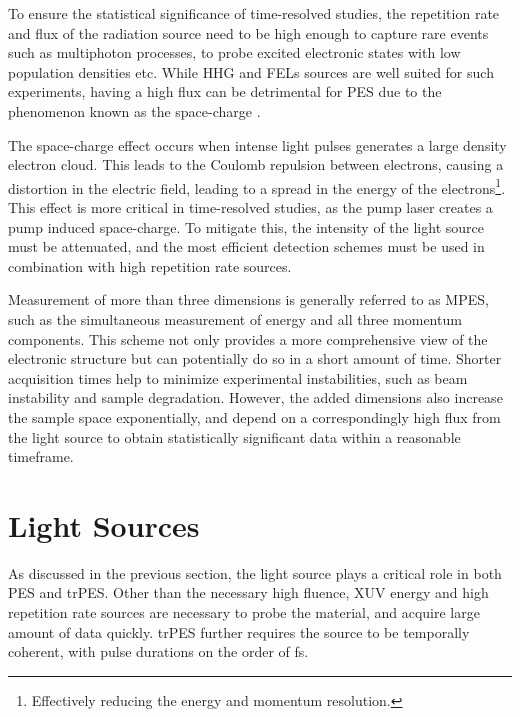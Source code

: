 To ensure the statistical significance of time-resolved studies, the repetition rate and flux of the radiation source need to be high enough to capture rare events such as multiphoton processes, to probe excited electronic states with low population densities etc. While \gls{HHG} and \glspl{FEL} sources are well suited for such experiments, having a high flux can be detrimental for \gls{PES} due to the phenomenon known as the \gls{space-charge} \cite{schonhenseMultidimensionalPhotoemissionSpectroscopy2018}.

The space-charge effect occurs when intense light pulses generates a large density electron cloud. This leads to the Coulomb repulsion between electrons, causing a distortion in the electric field, leading to a spread in the energy of the electrons\footnote{Effectively reducing the energy and momentum resolution.}. This effect is more critical in time-resolved studies, as the pump laser creates a pump induced space-charge. To mitigate this, the intensity of the light source must be attenuated, and the most efficient detection schemes must be used in combination with high repetition rate sources.


Measurement of more than three dimensions is generally referred to as \gls{MPES}, such as the simultaneous measurement of energy and all three momentum components. This scheme not only provides a more comprehensive view of the electronic structure but can potentially do so in a short amount of time. Shorter acquisition times help to minimize experimental instabilities, such as beam instability and sample degradation. However, the added dimensions also increase the sample space exponentially, and depend on a correspondingly high flux from the light source to obtain statistically significant data within a reasonable timeframe.

\section{Light Sources}\label{section:light-sources}
As discussed in the previous section, the light source plays a critical role in both \gls{PES} and \gls{trPES}. Other than the necessary high fluence, \gls{XUV} energy and high repetition rate sources are necessary to probe the material, and acquire large amount of data quickly. \gls{trPES} further requires the source to be temporally coherent, with pulse durations on the order of \unit{fs}.

